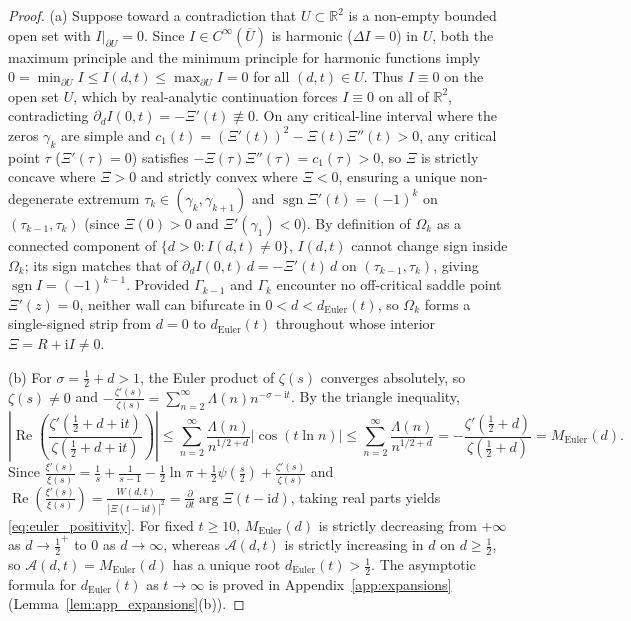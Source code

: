 \documentclass[11pt,a4paper,reqno]{amsart}
\theoremstyle{definition}
\theoremstyle{remark}
\numberwithin{equation}{section}
\newcommand{\ii}{\mathrm{i}}
\newcommand{\Rea}{\operatorname{Re}}
\begin{document}
\begin{proof}
(a) Suppose toward a contradiction that $U \subset \mathbb{R}^2$ is a non-empty bounded open set with $I|_{\partial U} = 0$. Since $I \in C^\infty(\overline{U})$ is harmonic ($\Delta I = 0$) in $U$, both the maximum principle and the minimum principle for harmonic functions imply $0 = \min_{\partial U} I \le I(d,t) \le \max_{\partial U} I = 0$ for all $(d,t) \in U$. Thus $I \equiv 0$ on the open set $U$, which by real-analytic continuation forces $I \equiv 0$ on all of $\mathbb{R}^2$, contradicting $\partial_d I(0,t) = -\Xi'(t) \not\equiv 0$. On any critical-line interval where the zeros $\gamma_k$ are simple and $c_1(t) = (\Xi'(t))^2 - \Xi(t)\Xi''(t) > 0$, any critical point $\tau$ ($\Xi'(\tau) = 0$) satisfies $-\Xi(\tau)\Xi''(\tau) = c_1(\tau) > 0$, so $\Xi$ is strictly concave where $\Xi > 0$ and strictly convex where $\Xi < 0$, ensuring a unique non-degenerate extremum $\tau_k \in (\gamma_k, \gamma_{k+1})$ and $\operatorname{sgn}\Xi'(t) = (-1)^k$ on $(\tau_{k-1}, \tau_k)$ (since $\Xi(0) > 0$ and $\Xi'(\gamma_1) < 0$). By definition of $\Omega_k$ as a connected component of $\{d > 0 : I(d,t) \neq 0\}$, $I(d,t)$ cannot change sign inside $\Omega_k$; its sign matches that of $\partial_d I(0,t)\,d = -\Xi'(t)\,d$ on $(\tau_{k-1}, \tau_k)$, giving $\operatorname{sgn} I = (-1)^{k-1}$. Provided $\Gamma_{k-1}$ and $\Gamma_k$ encounter no off-critical saddle point $\Xi'(z) = 0$, neither wall can bifurcate in $0 < d < d_{\mathrm{Euler}}(t)$, so $\Omega_k$ forms a single-signed strip from $d = 0$ to $d_{\mathrm{Euler}}(t)$ throughout whose interior $\Xi = R + \ii I \neq 0$.

(b) For $\sigma = \frac{1}{2} + d > 1$, the Euler product of $\zeta(s)$ converges absolutely, so $\zeta(s) \neq 0$ and $-\frac{\zeta'(s)}{\zeta(s)} = \sum_{n=2}^\infty \Lambda(n)n^{-\sigma-\ii t}$. By the triangle inequality,
\[
\left|\Rea\!\left(\frac{\zeta'(\frac{1}{2}+d+\ii t)}{\zeta(\frac{1}{2}+d+\ii t)}\right)\right| \le \sum_{n=2}^\infty \frac{\Lambda(n)}{n^{1/2+d}}\big|\cos(t\ln n)\big| \le \sum_{n=2}^\infty \frac{\Lambda(n)}{n^{1/2+d}} = -\frac{\zeta'(\frac{1}{2}+d)}{\zeta(\frac{1}{2}+d)} = M_{\mathrm{Euler}}(d).
\]
Since $\frac{\xi'(s)}{\xi(s)} = \frac{1}{s} + \frac{1}{s-1} - \frac{1}{2}\ln\pi + \frac{1}{2}\psi(\frac{s}{2}) + \frac{\zeta'(s)}{\zeta(s)}$ and $\Rea(\frac{\xi'(s)}{\xi(s)}) = \frac{W(d,t)}{|\Xi(t-\ii d)|^2} = \frac{\partial}{\partial t}\arg\Xi(t-\ii d)$, taking real parts yields \eqref{eq:euler_positivity}. For fixed $t \ge 10$, $M_{\mathrm{Euler}}(d)$ is strictly decreasing from $+\infty$ as $d \to \frac{1}{2}^+$ to $0$ as $d \to \infty$, whereas $\mathcal{A}(d,t)$ is strictly increasing in $d$ on $d \ge \frac{1}{2}$, so $\mathcal{A}(d,t) = M_{\mathrm{Euler}}(d)$ has a unique root $d_{\mathrm{Euler}}(t) > \frac{1}{2}$. The asymptotic formula for $d_{\mathrm{Euler}}(t)$ as $t \to \infty$ is proved in Appendix~\ref{app:expansions} (Lemma~\ref{lem:app_expansions}(b)).
\end{proof}
\end{document}
